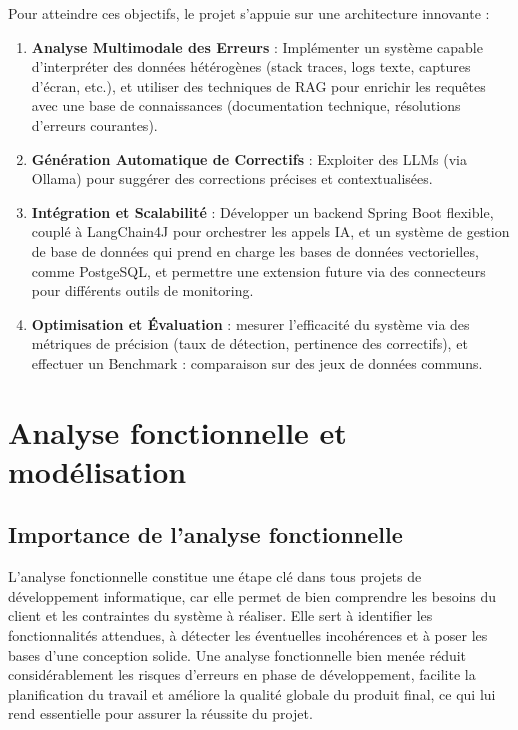 \documentclass[12pt,a4paper]{report}
\begin{document}
	Pour atteindre ces objectifs, le projet s’appuie sur une architecture innovante :
	
	\begin{enumerate}
		\item \textbf{Analyse Multimodale des Erreurs} : Implémenter un système capable d’interpréter des données hétérogènes (stack traces, logs texte, captures d’écran, etc.), et utiliser des techniques de RAG pour enrichir les requêtes avec une base de connaissances (documentation technique, résolutions d’erreurs courantes).
		
		\item \textbf{Génération Automatique de Correctifs} : Exploiter des LLMs (via Ollama) pour suggérer des corrections précises et contextualisées.
		
		\item \textbf{Intégration et Scalabilité} : Développer un backend Spring Boot flexible, couplé à LangChain4J pour orchestrer les appels IA, et un système de gestion de base de données qui prend en charge les bases de données vectorielles, comme PostgeSQL, et permettre une extension future via des connecteurs pour différents outils de monitoring.
		
		\item \textbf{Optimisation et Évaluation} : mesurer l’efficacité du système via des métriques de précision (taux de détection, pertinence des correctifs), et effectuer un Benchmark : comparaison sur des jeux de données communs.
		
	\end{enumerate}
	
	\chapter{Analyse fonctionnelle et modélisation}
	
	\section{Importance de l'analyse fonctionnelle}
	
	L’analyse fonctionnelle constitue une étape clé dans tous projets de développement informatique, car elle permet de bien comprendre les besoins du client et les contraintes du système à réaliser. Elle sert à identifier les fonctionnalités attendues, à détecter les éventuelles incohérences et à poser les bases d’une conception solide. Une analyse fonctionnelle bien menée réduit considérablement les risques d’erreurs en phase de développement, facilite la planification du travail et améliore la qualité globale du produit final, ce qui lui rend essentielle pour assurer la réussite du projet.
	
\end{document}
